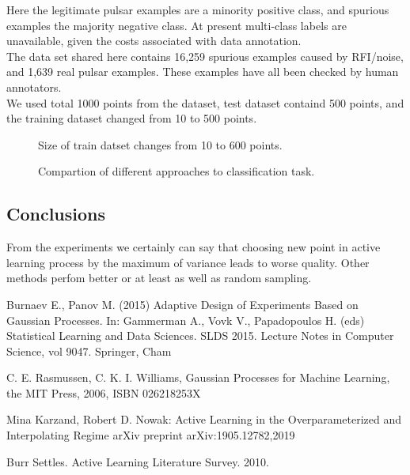 \documentclass[a4paper]{article}
\begin{document}
Here the legitimate pulsar examples are a minority positive class, and spurious examples the majority negative class. At present multi-class labels are unavailable, given the costs associated with data annotation.
\\
The data set shared here contains 16,259 spurious examples caused by RFI/noise, and 1,639 real pulsar examples. These examples have all been checked by human annotators. 
\\ 
We used total 1000 points from the dataset, test dataset containd 500 points, and the training dataset changed from 10 to 500 points.

\begin{figure}[h]
\begin{minipage}[c]{0.49\linewidth}
 Size of train datset changes from 10 to 600 points.
\end{minipage}
\caption{Compartion of different approaches to classification task.}
\label{HTRU}
\end{figure}

\subsection{Conclusions}
From the experiments we certainly can say that choosing new point in active learning process by the maximum of variance leads to worse quality. Other methods perfom better or at least as well as random sampling.

\clearpage
\begin{thebibliography}{}

Burnaev E., Panov M. (2015) 
Adaptive Design of Experiments Based on Gaussian Processes. In: Gammerman A., Vovk V., Papadopoulos H. (eds) Statistical Learning and Data Sciences. SLDS 2015. 
Lecture Notes in Computer Science, vol 9047. Springer, Cham

C. E. Rasmussen, C. K. I. Williams, 
Gaussian Processes for Machine Learning, 
the MIT Press, 2006, ISBN 026218253X

Mina Karzand, Robert D. Nowak:
Active Learning in the Overparameterized
and Interpolating Regime
arXiv preprint arXiv:1905.12782,2019

Burr Settles. 
Active Learning Literature Survey.  
2010.

\end{thebibliography}
\end{document}
